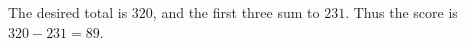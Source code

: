 The desired total is $320$, and the first three sum to $231$. Thus the score is $320-231=\boxed{89}$.
